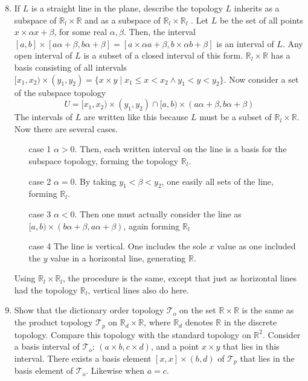 \documentclass[12pt,letterpaper]{article}
\newcommand{\n}{\break}
\newcommand{\T}{\ensuremath{\mathcal{T}}}
\begin{document}
\RaggedRight
\begin{enumerate}
  \setcounter{enumi}{7}
  \item If $L$ is a straight line in the plane, describe the topology $L$ inherits as a subspace of $\mathbb{R}_l \times \mathbb{R}$ and as a subspace of $\mathbb{R}_l\times\mathbb{R}_l$ \hspace{5in}.\n
  \indent Let $L$ be the set of all points $x\times \alpha x+\beta$, for some real $\alpha, \beta$. Then, the interval $[a,b]\times [a\alpha+\beta, b\alpha+\beta] = [a\times\alpha a+\beta, b\times\alpha b + \beta]$ is an interval of $L$. Any open interval of $L$ is a subset of a closed interval of this form. \n
  $\mathbb{R}_l\times\mathbb{R}$ has a basis consisting of all intervals $[x_1,x_2) \times (y_1,y_2) = \{x\times y \;|\; x_1\leq x < x_2 \wedge y_1<y<y_2\}$. Now consider a set of the subspace topology
  $$U = [x_1, x_2) \times (y_1, y_2) \cap [a,b)\times(a\alpha+\beta, b\alpha+\beta)$$ The intervals of $L$ are written like this because $L$ must be a subset of $\mathbb{R}_l\times\mathbb{R}$.
  Now there are several cases.
  \begin{enumerate}
    \item[case 1] $\alpha>0$. Then, each written interval on the line is a basis for the subspace topology, forming the topology $\mathbb{R}_l$.
    \item[case 2] $\alpha=0$. By taking $y_1<\beta<y_2$, one easily all sets of the line, forming $\mathbb{R}_l$.
    \item[case 3] $\alpha<0$. Then one must actually consider the line as $[a,b)\times(b\alpha+\beta, a\alpha+\beta)$, again forming $\mathbb{R}_l$
    \item[case 4] The line is vertical. One includes the sole $x$ value as one included the $y$ value in a horizontal line, generating $\mathbb{R}$.
  \end{enumerate}
  Using $\mathbb{R}_l\times\mathbb{R}_l$, the procedure is the same, except that just as horizontal lines had the topology $\mathbb{R}_l$, vertical lines also do here.
  \item Show that the dictionary order topology $\T_o$ on the set $\mathbb{R}\times\mathbb{R}$ is the same as the product topology $\T_p$ on $\mathbb{R}_d\times\mathbb{R}$, where $\mathbb{R}_d$ denotes $\mathbb{R}$ in the discrete topology. Compare this topology with the standard topology on $\mathbb{R}^2$.\n
  \indent Consider a basis interval of $\T_o$: $(a\times b, c\times d)$, and a point $x\times y$ that lies in this interval. There exists a basis element $[x,x] \times (b,d)$ of $\T_p$ that lies in the basis element of $\T_o$. Likewise when $a=c$.

\end{enumerate}
\end{document}
